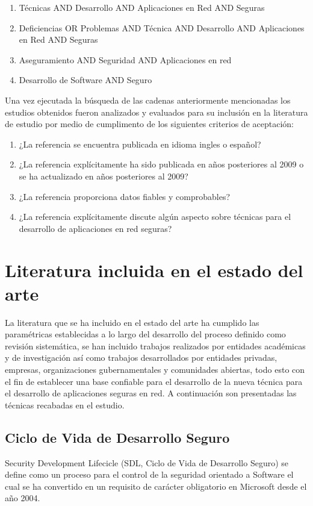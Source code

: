 \documentclass[runningheads,a4paper]{llncs}
\begin{document}
\begin{enumerate}
	\item Técnicas AND Desarrollo AND Aplicaciones en Red AND Seguras
	\item Deficiencias OR Problemas AND Técnica AND Desarrollo AND Aplicaciones en Red AND Seguras
	\item Aseguramiento AND Seguridad AND Aplicaciones en red
	\item Desarrollo de Software AND Seguro
\end{enumerate}

Una vez ejecutada la búsqueda de las cadenas anteriormente mencionadas los estudios obtenidos fueron analizados y evaluados para su inclusión en la literatura de estudio por medio de cumplimento de los siguientes criterios de aceptación:

\begin{enumerate}
	\item ¿La referencia se encuentra publicada en idioma ingles o español?
	\item ¿La referencia explícitamente ha sido publicada en años posteriores al 2009 o se ha actualizado en años posteriores al 2009?
	\item ¿La referencia proporciona datos fiables y comprobables?
	\item ¿La referencia explícitamente discute algún aspecto sobre técnicas para el desarrollo de aplicaciones en red seguras?
\end{enumerate}

\section{Literatura incluida en el estado del arte}
La literatura que se ha incluido en el estado del arte ha cumplido las paramétricas establecidas a lo largo del desarrollo del proceso definido como revisión sistemática, se han incluido trabajos realizados por entidades académicas y de investigación así como trabajos desarrollados por entidades privadas, empresas, organizaciones gubernamentales y comunidades abiertas, todo esto con el fin de establecer una base confiable para el desarrollo de la nueva técnica para el desarrollo de aplicaciones seguras en red. A continuación son presentadas las técnicas recabadas en el estudio.
 
\subsection{Ciclo de Vida de Desarrollo Seguro}
Security Development Lifecicle (SDL, Ciclo de Vida de Desarrollo Seguro) se define como un proceso para el control de la seguridad orientado a \gls{Software} el cual se ha convertido en un requisito de carácter obligatorio en Microsoft desde el año 2004. 
\end{document}
